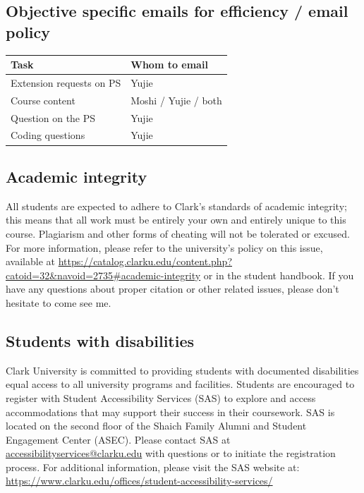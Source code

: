 \documentclass[11pt]{article}
\newcommand{\InstructorShort}{Moshi}
\newcommand{\TAShort}{Yujie}
\begin{document}
\subsection{Objective specific emails for efficiency / email policy}\hspace{0pt}\par
\vspace{0.4em}
\begin{center}
\begin{tabularx}{0.8\textwidth}{@{}Xl@{}}
\toprule
\textbf{Task} & \textbf{Whom to email} \\
\midrule
Extension requests on PS & \TAShort \\
Course content           & \InstructorShort{} / \TAShort{} / both \\
Question on the PS       & \TAShort \\
Coding questions         & \TAShort \\
\bottomrule
\end{tabularx}
\end{center}

\subsection{Academic integrity}\hspace{0pt}\par
All students are expected to adhere to Clark's standards of academic integrity;
this means that all work must be entirely your own and entirely unique to this
course. Plagiarism and other forms of cheating will not be tolerated or excused.
For more information, please refer to the university's policy on this issue,
available at
\url{https://catalog.clarku.edu/content.php?catoid=32&navoid=2735#academic-integrity}
or in the student handbook. If you have any questions about proper citation or
other related issues, please don't hesitate to come see me.

\subsection{Students with disabilities}\hspace{0pt}\par
Clark University is committed to providing students with documented disabilities
equal access to all university programs and facilities. Students are encouraged
to register with Student Accessibility Services (SAS) to explore and access
accommodations that may support their success in their coursework. SAS is located
on the second floor of the Shaich Family Alumni and Student Engagement Center
(ASEC). Please contact SAS at
\href{mailto:accessibilityservices@clarku.edu}{accessibilityservices@clarku.edu}
with questions or to initiate the registration process. For additional
information, please visit the SAS website at:
\url{https://www.clarku.edu/offices/student-accessibility-services/}
\end{document}
